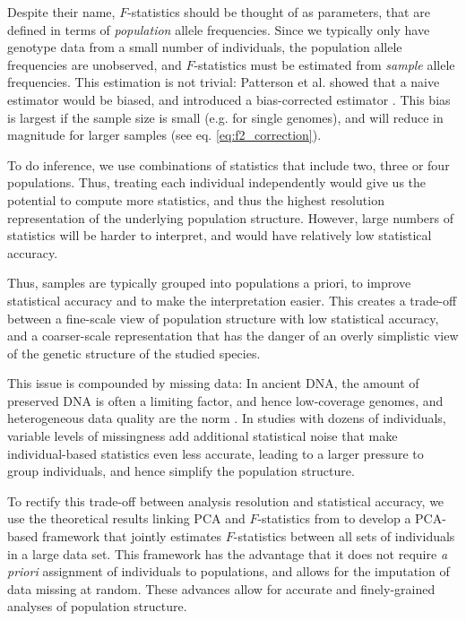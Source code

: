 \documentclass[12pt]{article}
\begin{document}
Despite their name, $F$-statistics should be thought of as parameters, that are defined in terms of \textit{population} allele frequencies. Since we typically only have genotype data from a small number of individuals, the population allele frequencies are unobserved, and $F$-statistics must be estimated from \emph{sample} allele frequencies. This estimation is not trivial: Patterson et al. showed that a naive estimator would be biased, and introduced a bias-corrected estimator \citep{patterson_ancient_2012}. This bias is largest if the sample size is small (e.g. for single genomes), and will reduce in magnitude for larger samples (see eq. \ref{eq:f2_correction}). 

To do inference, we use combinations of statistics that include two, three or four populations. Thus, treating each individual independently would give us the potential to compute more statistics, and thus the highest resolution representation of the underlying population structure. However, large numbers of statistics will be harder to interpret, and would have relatively low statistical accuracy. 

Thus, samples are typically grouped into populations a priori, to improve statistical accuracy and to make the interpretation easier. This creates a trade-off between a fine-scale view of population structure with low statistical accuracy, and a coarser-scale representation that has the danger of an overly simplistic view of the genetic structure of the studied species.

This issue is compounded by missing data: In ancient DNA, the amount of preserved DNA is often a limiting factor, and hence low-coverage genomes, and heterogeneous data quality are the norm \citep{orlando_ancient_2021}. In studies with dozens of individuals, variable levels of missingness add additional statistical noise that make individual-based statistics even less accurate, leading to a larger pressure to group individuals, and hence simplify the population structure. 

To rectify this trade-off between analysis resolution and statistical accuracy, we use the theoretical results linking PCA and $F$-statistics from \cite{peter_geometric_2022} to develop a PCA-based framework that jointly estimates $F$-statistics between all sets of individuals in a large data set. This framework has the advantage that it does not require \textit{a priori} assignment of individuals to populations, and allows for the imputation of data missing at random. These advances allow for accurate and finely-grained analyses of population structure.
\end{document}
